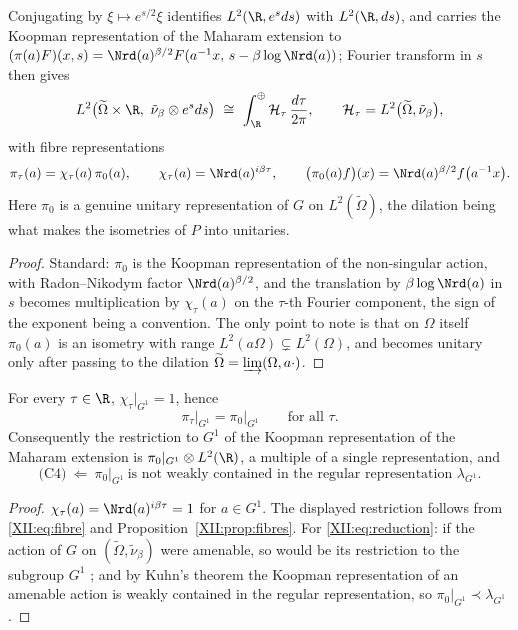 \begin{proposition}\label{XII:prop:fibres}
Conjugating by $\xi\mapsto e^{s/2}\xi$ identifies $L^2(\R,e^{s}ds)$ with $L^2(\R,ds)$, and
carries the Koopman representation of the Maharam extension to
$(\pi(a)F)(x,s)=\Nrd(a)^{\beta/2}F(a^{-1}x,\,s-\beta\log\Nrd(a))$; Fourier transform in $s$ then
gives
\[
L^2\bigl(\widetilde\Omega\times\R,\ \tilde\nu_\beta\otimes e^{s}ds\bigr)
\ \cong\ \int_\R^\oplus\mathcal H_\tau\,\frac{d\tau}{2\pi},
\qquad
\mathcal H_\tau=L^2\bigl(\widetilde\Omega,\tilde\nu_\beta\bigr),
\]
with fibre representations
\begin{equation}\label{XII:eq:fibre}
\pi_\tau(a)=\chi_\tau(a)\,\pi_0(a),
\qquad
\chi_\tau(a)=\Nrd(a)^{i\beta\tau},
\qquad
\bigl(\pi_0(a)f\bigr)(x)=\Nrd(a)^{\beta/2}f\bigl(a^{-1}x\bigr).
\end{equation}
Here $\pi_0$ is a genuine unitary representation of $G$ on $L^2(\widetilde\Omega)$, the
dilation being what makes the isometries of $P$ into unitaries.
\end{proposition}

\begin{proof}
Standard: $\pi_0$ is the Koopman representation of the non-singular action, with
Radon--Nikodym factor $\Nrd(a)^{\beta/2}$, and the translation by $\beta\log\Nrd(a)$ in $s$
becomes multiplication by $\chi_\tau(a)$ on the $\tau$-th Fourier component, the sign of the
exponent being a convention. The only point to note is that on $\Omega$ itself $\pi_0(a)$ is
an isometry with range $L^2(a\Omega)\subsetneq L^2(\Omega)$, and becomes unitary only after
passing to the dilation $\widetilde\Omega=\varinjlim(\Omega,a\cdot)$.
\end{proof}

\begin{theorem}\label{XII:thm:invisible}
For every $\tau\in\R$, $\chi_\tau|_{G^1}=1$, hence
\[
\pi_\tau\big|_{G^1}=\pi_0\big|_{G^1}\qquad\text{for all }\tau .
\]
Consequently the restriction to $G^1$ of the Koopman representation of the Maharam extension
is $\pi_0|_{G^1}\otimes L^2(\R)$, a multiple of a single representation, and
\begin{equation}\label{XII:eq:reduction}
\text{(C4)}\ \Longleftarrow\ \pi_0\big|_{G^1}\ \text{is not weakly contained in the regular representation }\lambda_{G^1}.
\end{equation}
\end{theorem}

\begin{proof}
$\chi_\tau(a)=\Nrd(a)^{i\beta\tau}=1$ for $a\in G^1$. The displayed restriction follows from
\eqref{XII:eq:fibre} and Proposition~\ref{XII:prop:fibres}. For \eqref{XII:eq:reduction}: if the
action of $G$ on $(\widetilde\Omega,\tilde\nu_\beta)$ were amenable, so would be its
restriction to the subgroup $G^1$ \cite{AD}; and by Kuhn's theorem \cite{Kuhn}
the Koopman representation of an amenable action is weakly contained in the regular
representation, so $\pi_0|_{G^1}\prec\lambda_{G^1}$.
\end{proof}

